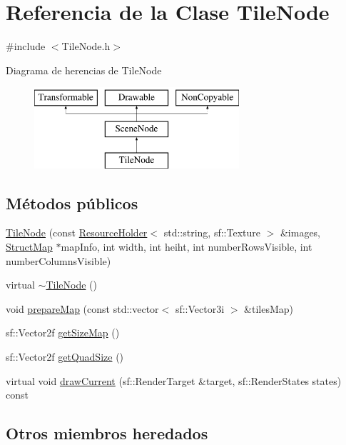 \hypertarget{classTileNode}{}\section{Referencia de la Clase Tile\+Node}
\label{classTileNode}


{\ttfamily \#include $<$Tile\+Node.\+h$>$}

Diagrama de herencias de Tile\+Node\begin{figure}[H]
\begin{center}
\leavevmode
\includegraphics[height=3.000000cm]{classTileNode}
\end{center}
\end{figure}
\subsection*{Métodos públicos}
\begin{DoxyCompactItemize}
\item 
\hyperlink{classTileNode_aaa13aaf03e5e221fbec713ce849edd7d}{Tile\+Node} (const \hyperlink{classResourceHolder}{Resource\+Holder}$<$ std\+::string, sf\+::\+Texture $>$ \&images, \hyperlink{structStructMap}{Struct\+Map} $\ast$map\+Info, int width, int heiht, int number\+Rows\+Visible, int number\+Columns\+Visible)
\item 
virtual \hyperlink{classTileNode_a00c7f860dccefb4f09a43b66df52c1c8}{$\sim$\+Tile\+Node} ()
\item 
void \hyperlink{classTileNode_aab3c5946b20750e03cc754433e5996b1}{prepare\+Map} (const std\+::vector$<$ sf\+::\+Vector3i $>$ \&tiles\+Map)
\item 
sf\+::\+Vector2f \hyperlink{classTileNode_a18855e4bee1ac13ee766e8c4c676f8b0}{get\+Size\+Map} ()
\item 
sf\+::\+Vector2f \hyperlink{classTileNode_a3be8b7dad0a971c15269bbcb1fbed7de}{get\+Quad\+Size} ()
\item 
virtual void \hyperlink{classTileNode_a1e1c9f93605e91a87750f75f6a158f24}{draw\+Current} (sf\+::\+Render\+Target \&target, sf\+::\+Render\+States states) const 
\end{DoxyCompactItemize}
\subsection*{Otros miembros heredados}


